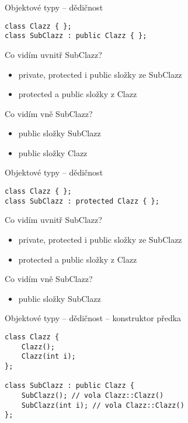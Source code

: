 \begin{frame}[fragile]
\begin{exampleblock}{Objektové typy -- dědičnost} 
\begin{lstlisting}
class Clazz { };
class SubClazz : public Clazz { };
\end{lstlisting}
\end{exampleblock}
\begin{block}{}

Co vidím uvnitř SubClazz?
\begin{itemize}
\item private, protected i public složky ze SubClazz
\item protected a public složky z Clazz
\end{itemize}

Co vidím vně SubClazz?
\begin{itemize}
\item public složky SubClazz
\item public složky Clazz
\end{itemize}
\end{block}
\end{frame}

\begin{frame}[fragile]
\begin{exampleblock}{Objektové typy -- dědičnost} 
\begin{lstlisting}
class Clazz { };
class SubClazz : protected Clazz { };
\end{lstlisting}
\end{exampleblock}
\begin{block}{}
Co vidím uvnitř SubClazz?
\begin{itemize}
\item private, protected i public složky ze SubClazz
\item protected a public složky z Clazz
\end{itemize}

Co vidím vně SubClazz?
\begin{itemize}
\item public složky SubClazz
\end{itemize}
\end{block}
\end{frame}


\begin{frame}[fragile]
\begin{exampleblock}{Objektové typy -- dědičnost -- konstruktor předka} 
\begin{lstlisting}
class Clazz { 
	Clazz();
	Clazz(int i);
};

class SubClazz : public Clazz { 
	SubClazz(); // vola Clazz::Clazz()
	SubClazz(int i); // vola Clazz::Clazz()
};
\end{lstlisting}
\end{exampleblock}
\end{frame}


